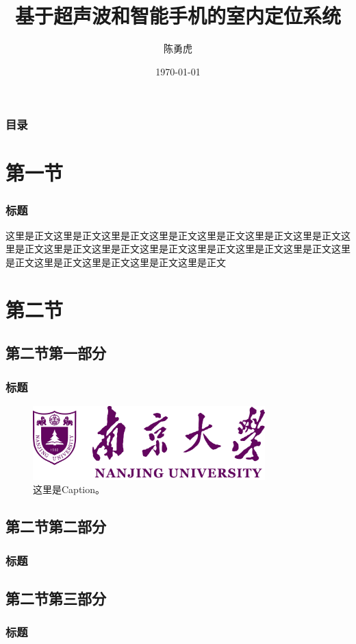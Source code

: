 \documentclass[xetex,mathserif,serif,handout]{beamer}
\begin{document}
	\title{基于超声波和智能手机的室内定位系统}
	\author{陈勇虎}
	\date{\today}

	\frame{\titlepage}

	\begin{frame}
		\frametitle{目录}
		\makecontents
	\end{frame}

	\section{第一节}
	\begin{frame}
		\frametitle{标题}
		这里是正文这里是正文这里是正文这里是正文这里是正文这里是正文这里是正文这里是正文这里是正文这里是正文这里是正文这里是正文这里是正文这里是正文这里是正文这里是正文这里是正文这里是正文这里是正文\cite{XENON1T:SD}
	\end{frame}

	\section{第二节}
	\subsection{第二节第一部分}
	\begin{frame}
		\frametitle{标题}
		\begin{figure}
			\centering
			\includegraphics[width=0.8\textwidth]{logo/NJU_LogoAndName.jpg}
			\caption{这里是Caption。}
		\end{figure}
	\end{frame}
	\subsection{第二节第二部分}
	\begin{frame}
		\frametitle{标题}
	\end{frame}
	\subsection{第二节第三部分}
	\begin{frame}
		\frametitle{标题}
	\end{frame}
\end{document}
